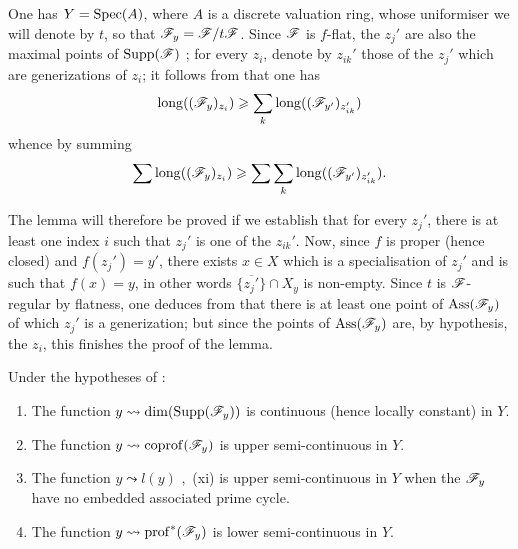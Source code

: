 \begin{env}[12.2.1.3]
One has $Y=\operatorname{Spec}(A)$, where $A$ is a discrete valuation ring, whose uniformiser we will denote by $t$, so that $\mathscr{F}_y=\mathscr{F}/t\mathscr{F}$.
Since $\mathscr{F}$ is $f$-flat, the $z_j'$ are also the maximal points of $\operatorname{Supp}(\mathscr{F})$ ; for every $z_i$, denote by $z_{ik}'$ those of the $z_j'$ which are generizations of $z_i$; it follows from  that one has
\[
  \operatorname{long}((\mathscr{F}_y)_{z_i}) \geqslant \sum_k \operatorname{long}((\mathscr{F}_{y'})_{z_{ik}'})
\]
whence by summing
\[
  \sum \operatorname{long}((\mathscr{F}_y)_{z_i}) \geqslant \sum \sum_k \operatorname{long}((\mathscr{F}_{y'})_{z_{ik}'}).
\]

The lemma will therefore be proved if we establish that for every $z_j'$, there is at least one index $i$ such that $z_j'$ is one of the $z_{ik}'$.
Now, since $f$ is proper (hence closed) and $f(z_j')=y'$, there exists $x\in X$ which is a specialisation of $z_j'$ and is such that $f(x)=y$, in other words $\overline{\{z_j'\}}\cap X_y$ is non-empty.
Since $t$ is $\mathscr{F}$-regular by flatness, one deduces from  that there is at least one point of $\operatorname{Ass}(\mathscr{F}_y)$ of which $z_j'$ is a generization; but since the points of $\operatorname{Ass}(\mathscr{F}_y)$ are, by hypothesis, the $z_i$, this finishes the proof of the lemma.
\end{env}

\begin{corollary}[12.2.2]
\label{IV.12.2.2}
Under the hypotheses of :
\begin{enumerate}[label=\textup{(\roman*)}]
  \item The function $y\leadsto\dim(\operatorname{Supp}(\mathscr{F}_y))$ is continuous (hence locally constant) in $Y$.
  \item The function $y\leadsto\operatorname{coprof}(\mathscr{F}_y)$  is upper semi-continuous in $Y$.
  \item The function $y\leadsto l(y)$ ,~\textup{(xi)} is upper semi-continuous in $Y$ when the $\mathscr{F}_y$ have no embedded associated prime cycle.
  \item The function $y\leadsto\operatorname{prof}^*(\mathscr{F}_y)$  is lower semi-continuous in $Y$.
\end{enumerate}
\end{corollary}

